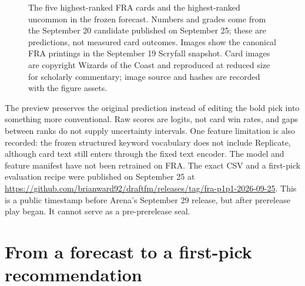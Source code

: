 \documentclass[11pt]{article}
\newcommand{\datadir}{data/followup_20260920}
\begin{document}
\begin{figure}[tbp]
\centering
{}\hfill
{}\hfill
{}

\vspace{10pt}

\hfill
{}\hfill
{}

\caption{The five highest-ranked FRA cards and the highest-ranked uncommon in
the frozen forecast. Numbers and grades come from the September 20
candidate published on September 25; these are predictions, not measured
card outcomes. Images show the canonical FRA printings in the September 19
Scryfall snapshot. Card images are
copyright Wizards of the Coast and reproduced at reduced size for scholarly
commentary; image source and hashes are recorded with the figure assets.}
\label{fig:fra-cards}
\end{figure}

\begin{table}[htbp]
\centering\small

\caption{The top ten of all 109 FRA uncommons. This is a filter of the original
forecast, with no rescoring or regrading. The full uncommon ordering and the
295-card forecast accompany the note.}\label{tab:uncommons}
\end{table}

The preview preserves the original prediction instead of editing the bold
pick into something more conventional. Raw scores are logits, not card win
rates, and gaps between ranks do not supply uncertainty intervals. One
feature limitation is also recorded: the frozen structured keyword
vocabulary does not include Replicate, although card text still enters
through the fixed text encoder. The model and feature manifest have not
been retrained on FRA. The exact CSV and a first-pick evaluation recipe were
published on September 25 at
\url{https://github.com/brianward92/draftfm/releases/tag/fra-p1p1-2026-09-25}.
This is a public timestamp before Arena's September 29 release, but after
prerelease play began. It cannot serve as a pre-prerelease seal.

\section{From a forecast to a first-pick recommendation}
\end{document}
